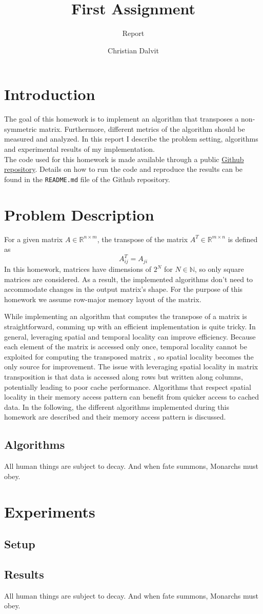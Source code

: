 \documentclass{scrartcl}
\title{First Assignment}
\subtitle{Report}
\author{Christian Dalvit}
\begin{document}
    \maketitle
    \section{Introduction}    
    The goal of this homework is to implement an algorithm that transposes a non-symmetric matrix. Furthermore, different metrics of the algorithm should be measured and analyzed. In this report I describe the problem setting, algorithms and experimental results of my implementation.\\
    The code used for this homework is made available through a public \href{https://github.com/chrisdalvit/matrix-transpose-benchmark}{Github repository}. Details on how to run the code and reproduce the results can be found in the \texttt{README.md} file of the Github repository.

    \section{Problem Description}
    For a given matrix $A \in \mathbb{R}^{n \times m}$, the transpose of the matrix $A^T \in \mathbb{R}^{m \times n}$ is defined as
    $$
        A^T_{ij} = A_{ji}
    $$
    In this homework, matrices have dimensions of $2^N$ for $N \in \mathbb{N}$, so only square matrices are considered. As a result, the implemented algorithms don't need to accommodate changes in the output matrix's shape. For the purpose of this homework we assume row-major memory layout of the matrix.

    While implementing an algorithm that computes the transpose of a matrix is straightforward, comming up with an efficient implementation is quite tricky. In general, leveraging spatial and temporal locality can improve efficiency. Because each element of the matrix is accessed only once, temporal locality cannot be exploited for computing the transposed matrix \cite{chatterjee2000cache}, so spatial locality becomes the only source for improvement. The issue with leveraging spatial locality in matrix transposition is that data is accessed along rows but written along columns, potentially leading to poor cache performance. Algorithms that respect spatial locality in their memory access pattern can benefit from quicker access to cached data. In the following, the different algorithms implemented during this homework are described and their memory access pattern is discussed.

    \subsection{Algorithms}
    All human things are subject to decay. And when fate summons, Monarchs must obey.

    \section{Experiments}
    \subsection{Setup}
    \subsection{Results}
    All human things are subject to decay. And when fate summons, Monarchs must obey.

    \printbibliography
\end{document}
